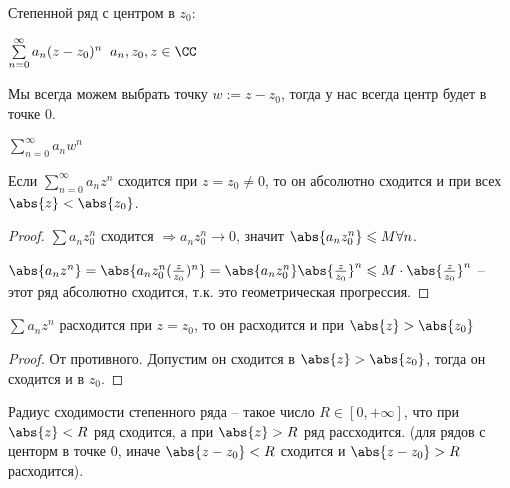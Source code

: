 

\begin{definition}\slashns
    
    Степенной ряд с центром в $z_0$:
    
    $\sum\limits_{n = 0}^{\infty} a_n(z - z_0)^n \;\; a_n,z_0, z \in \CC$
    
    Мы всегда можем выбрать точку $w := z - z_0$, тогда у нас всегда центр будет в точке 0.
    
    $\sum\limits_{n = 0}^{\infty} a_nw^n$
\end{definition}

\begin{theorem}\slashns
    
    Если $\sum\limits_{n = 0}^{\infty} a_nz^n$ сходится при $z = z_0 \not = 0$, то он абсолютно сходится и при всех $\abs{z} < \abs{z_0}$.
\end{theorem}

\begin{proof}\slashns
    
    $\sum a_nz_0^n$ сходится $\Rightarrow a_nz_0^n \to 0$, значит $\abs{a_nz_0^n} \leqslant M \forall n$.
    
    $\abs{a_n z^n} = \abs{ a_nz_0^n (\frac{z}{z_0})^n } = \abs{ a_nz_0^n} \abs{ \frac{z}{z_0} }^n \leqslant M \cdot \abs{ \frac{z}{z_0} }^n$ -- этот ряд абсолютно сходится, т.к. это геометрическая прогрессия.

\end{proof}

\begin{consequence}\slashns
    
    $\sum a_nz^n$ расходится при $z = z_0$, то он расходится и при $\abs{z} > \abs{z_0}$
\end{consequence}

\begin{proof}\slashns
    
    От противного. Допустим он сходится в $\abs{z} > \abs{z_0}$, тогда он сходится и в $z_0$.
\end{proof}

\begin{definition}\slashns
    
    Радиус сходимости степенного ряда -- такое число $R \in [0, +\infty]$, что при $\abs{z} < R$ ряд сходится, а при $\abs{z} > R$ ряд рассходится. (для рядов с центорм в точке 0, иначе $\abs{z - z_0} < R$ сходится и $\abs{z - z_0} > R$ расходится).
\end{definition}

